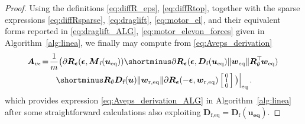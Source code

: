 \begin{proof}
Using the definitions \eqref{eq:diffR_eps}, \eqref{eq:diffRtop}, together with the sparse expressions \eqref{eq:diffRsparse}, \eqref{eq:draglift}, \eqref{eq:motor_el}, and their equivalent forms reported in \eqref{eq:draglift_ALG}, \eqref{eq:motor_elevon_forces} given in Algorithm~\ref{alg:linea}, we finally may compute from \eqref{eq:Aveps_derivation}
\begin{multline*}
    \!\boldsymbol{A}_{v\epsilon} \!=\! \frac{1}{m} \big( \partial \boldsymbol{R}_{\boldsymbol{ \epsilon}} (\boldsymbol{ \epsilon} , \boldsymbol{M}_{\text{f}}(\boldsymbol{u_{\text{eq}}}))  \shortminus \partial \boldsymbol{R}_{\boldsymbol{ \epsilon}} ( \boldsymbol{ \epsilon} ,\boldsymbol{D}_{\text{f}}(\boldsymbol{u_{\text{eq}}})  \lVert \boldsymbol{w}_{\mathrm{eq}} \rVert  \boldsymbol{R}_\theta^\top \! \boldsymbol{w}_{\mathrm{eq}})  \\    \left. \shortminus  \boldsymbol{R}_\theta \boldsymbol{D}_{\text{f}}(\boldsymbol{u})  \lVert \boldsymbol{w}_{\mathrm{r,eq}} \rVert \partial \boldsymbol{R}_{\boldsymbol{ \epsilon}}( -\boldsymbol{ \epsilon}, \boldsymbol{w}_{\mathrm{r,eq}})\smallmat{0\\ 1\\ 0} \big)\right|_{\mathrm{eq}}.
\end{multline*}
which provides expression \eqref{eq:Aveps_derivation_ALG} in Algorithm~\ref{alg:linea}
after some straightforward calculations also exploiting  $\boldsymbol{D}_{\text{f,eq}} = \boldsymbol{D}_{\text{f}}(\boldsymbol{u_{\text{eq}}})$.



\end{proof}
